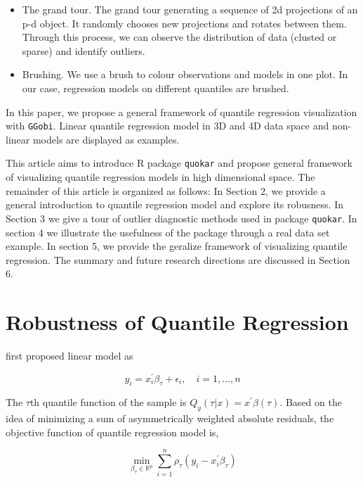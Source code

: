 \documentclass[article]{jss}
\theoremstyle{definition}
\theoremstyle{definition}
\theoremstyle{remark}
\begin{document}
\begin{itemize}
\item
  The grand tour. The grand tour generating a sequence of 2d projections
  of an p-d object. It randomly chooses new projections and rotates
  between them. Through this process, we can observe the distribution of
  data (clusted or sparse) and identify outliers.
\item
  Brushing. We use a brush to colour observations and models in one
  plot. In our case, regression models on different quantiles are
  brushed.
\end{itemize}

In this paper, we propose a general framework of quantile regression
visualization with \texttt{GGobi}. Linear quantile regression model in
3D and 4D data space and non-linear models are displayed as examples.

This article aims to introduce R package \texttt{quokar} and propose
general framework of visualizing quantile regression models in high
dimensional space. The remainder of this article is organized as
follows: In Section 2, we provide a general introduction to quantile
regression model and explore its robusness. In Section 3 we give a tour
of outlier diagnostic methods used in package \texttt{quokar}. In
section 4 we illustrate the usefulness of the package through a real
data set example. In section 5, we provide the geralize framework of
visualizing quantile regression. The summary and future research
directions are discussed in Section 6.

\section{Robustness of Quantile
Regression}\label{robustness-of-quantile-regression}

\citet{koenker1978regression} first proposed linear model as

\begin{equation}
y_i=x^{'}_{i}\beta_{\tau}+\epsilon_{i}, \quad i=1,...,n
\label{eq:linear_qr}
\end{equation}

The \(\tau\)th quantile function of the sample is
\(Q_{y}(\tau|x)=x^{'}\beta(\tau)\). Based on the idea of minimizing a
sum of asymmetrically weighted absolute residuals, the objective
function of quantile regression model is,

\begin{equation}
\min_{\beta_{\tau} \in \mathbb{R}^{p}}\sum_{i=1}^{n} \rho_{\tau}(y_i-x_{i}^{'}\beta_{\tau})
\label{eq:object_function}
\end{equation}
\end{document}
